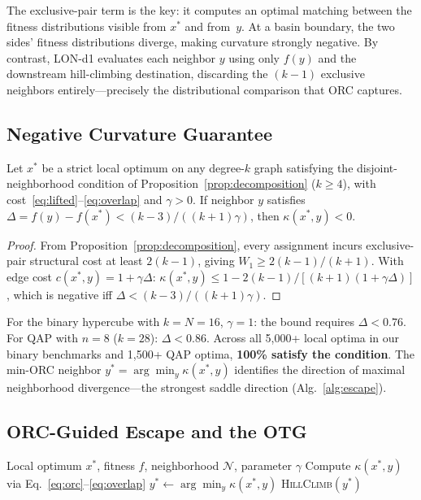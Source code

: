 \documentclass[runningheads]{llncs}
\begin{document}
The exclusive-pair term is the key: it computes an optimal matching between the fitness distributions visible from $x^*$ and from~$y$.
At a basin boundary, the two sides' fitness distributions diverge, making curvature strongly negative.
By contrast, LON-d1 evaluates each neighbor $y$ using only $f(y)$ and the downstream hill-climbing destination, discarding the $(k\!-\!1)$ exclusive neighbors entirely---precisely the distributional comparison that ORC captures.

\subsection{Negative Curvature Guarantee}
\label{sec:theory}

\begin{theorem}
\label{thm:negative}
Let $x^*$ be a strict local optimum on any degree-$k$ graph satisfying the disjoint-neighborhood condition of Proposition~\ref{prop:decomposition} ($k \ge 4$), with cost~\eqref{eq:lifted}--\eqref{eq:overlap} and $\gamma > 0$.
If neighbor $y$ satisfies $\Delta = f(y) - f(x^*) < (k\!-\!3)/((k\!+\!1)\gamma)$, then $\kappa(x^*,y) < 0$.
\end{theorem}

\begin{proof}
From Proposition~\ref{prop:decomposition}, every assignment incurs exclusive-pair structural cost at least $2(k\!-\!1)$, giving $W_1 \ge 2(k\!-\!1)/(k\!+\!1)$.
With edge cost $c(x^*,y) = 1 + \gamma\Delta$:
$\kappa(x^*,y) \le 1 - 2(k-1)/[(k+1)(1+\gamma\Delta)]$,
which is negative iff $\Delta < (k-3)/((k+1)\gamma)$.
\end{proof}

For the binary hypercube with $k = N = 16$, $\gamma = 1$: the bound requires $\Delta < 0.76$.
For QAP with $n = 8$ ($k = 28$): $\Delta < 0.86$.
Across all 5{,}000+ local optima in our binary benchmarks and 1{,}500+ QAP optima, \textbf{100\% satisfy the condition}.
The min-ORC neighbor $y^* = \arg\min_y \kappa(x^*, y)$ identifies the direction of maximal neighborhood divergence---the strongest saddle direction (Alg.~\ref{alg:escape}).

\subsection{ORC-Guided Escape and the OTG}
\label{sec:otg_def}

\begin{algorithm}[t]
\caption{ORC-Guided Escape from a Local Optimum}
\label{alg:escape}
\begin{algorithmic}[1]
\REQUIRE Local optimum $x^*$, fitness $f$, neighborhood $\mathcal{N}$, parameter $\gamma$
  \STATE Compute $\kappa(x^*, y)$ via Eq.~\eqref{eq:orc}--\eqref{eq:overlap}
\ENDFOR
\STATE $y^* \leftarrow \arg\min_{y} \kappa(x^*, y)$
\RETURN \textsc{HillClimb}$(y^*)$
\end{algorithmic}
\end{algorithm}
\end{document}
